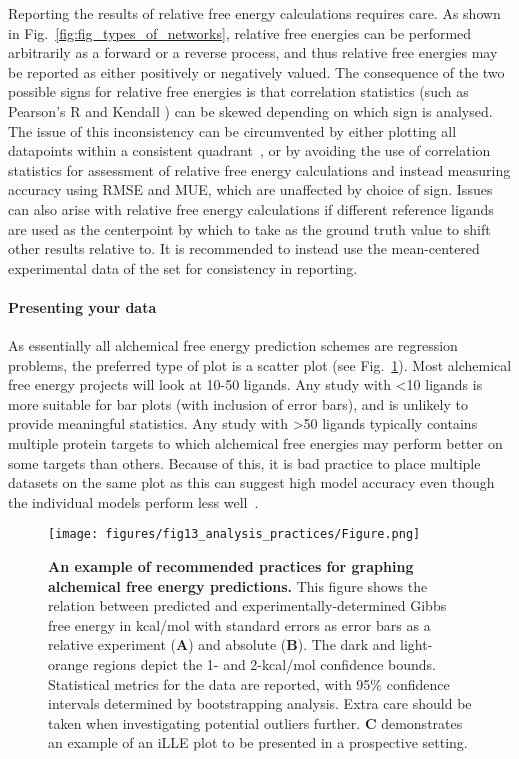 \documentclass[9pt,bestpractices,pubversion]{livecoms}
\begin{document}
Reporting the results of relative free energy calculations requires care. As shown in Fig.~\ref{fig:fig_types_of_networks}, relative free energies can be performed arbitrarily as a forward or a reverse process, and thus relative free energies may be reported as either positively or negatively valued. The consequence of the two possible signs for relative free energies is that correlation statistics (such as Pearson's R and Kendall \texttau{}) can be skewed depending on which sign is analysed. The issue of this inconsistency can be circumvented by either plotting all datapoints within a consistent quadrant~\cite{perez-benito2019predicting}, or by avoiding the use of correlation statistics for assessment of relative free energy calculations and instead measuring accuracy using RMSE and MUE, which are unaffected by choice of sign. Issues can also arise with relative free energy calculations if different reference ligands are used as the centerpoint by which to take as the ground truth value to shift other results relative to. It is recommended to instead use the mean-centered experimental data of the set for consistency in reporting\cite{gathiaka2016d3r}.


\paragraph{Presenting your data}
As essentially all alchemical free energy prediction schemes are regression problems, the preferred type of plot is a scatter plot (see Fig.~\ref{fig:scatterplot_analysis}). Most alchemical free energy projects will look at 10-50 ligands. Any study with \textless10 ligands is more suitable for bar plots (with inclusion of error bars), and is unlikely to provide meaningful statistics. Any study with \textgreater50 ligands typically contains multiple protein targets to which alchemical free energies may perform better on some targets than others. Because of this, it is bad practice to place multiple datasets on the same plot as this can suggest high model accuracy even though the individual models perform less well~\cite{walterthoughts}.

\begin{figure}
  \texttt{[image: figures/fig13\_analysis\_practices/Figure.png]}
  \caption{\textbf{An example of recommended practices for graphing alchemical free energy predictions.} This figure shows the relation between predicted and experimentally-determined Gibbs free energy in kcal/mol with standard errors as error bars as a relative experiment (\textbf{A}) and absolute (\textbf{B}). The dark and light-orange regions depict the 1- and 2-kcal/mol confidence bounds. Statistical metrics for the data are reported, with 95\% confidence intervals determined by bootstrapping analysis. Extra care should be taken when investigating potential outliers further. \textbf{C} demonstrates an example of an iLLE plot to be presented in a prospective setting.}
   \label{fig:scatterplot_analysis}
\end{figure}
\end{document}
